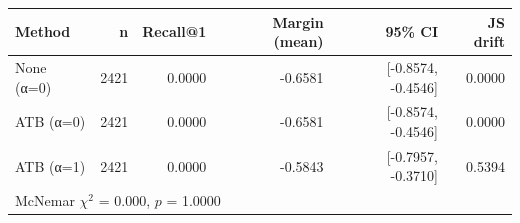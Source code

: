 \begin{tabular}{l r r r r r}
\toprule
Method & n & Recall@1 & Margin (mean) & 95\% CI & JS drift \\
\midrule
None (α=0) & 2421 & 0.0000 & -0.6581 & [-0.8574, -0.4546] & 0.0000 \\
ATB (α=0) & 2421 & 0.0000 & -0.6581 & [-0.8574, -0.4546] & 0.0000 \\
ATB (α=1) & 2421 & 0.0000 & -0.5843 & [-0.7957, -0.3710] & 0.5394 \\
\midrule
\multicolumn{6}{l}{McNemar $\chi^2$ = 0.000, $p$ = 1.0000} \\
\bottomrule
\end{tabular}
